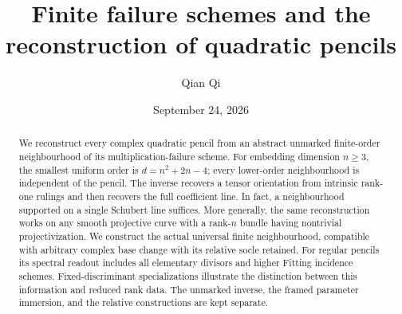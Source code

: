 \title[Finite failure schemes and quadratic pencils]{Finite failure schemes and the reconstruction of quadratic pencils}
\author{Qian Qi}
\date{September 24, 2026}
\begin{abstract}
We reconstruct every complex quadratic pencil from an abstract unmarked
finite-order neighbourhood of its multiplication-failure scheme.
For embedding dimension \(n\ge3\), the smallest uniform order is
\(d=n^2+2n-4\); every lower-order neighbourhood is independent of the
pencil.  The inverse recovers a tensor orientation from intrinsic
rank-one rulings and then recovers the full coefficient line.  In fact,
a neighbourhood supported on a single Schubert line suffices.  More
generally, the same reconstruction works on any smooth projective curve
with a rank-\(n\) bundle having nontrivial projectivization.  We construct
the actual universal finite neighbourhood, compatible with arbitrary
complex base change with its relative socle retained.  For regular
pencils its spectral readout includes all elementary divisors and
higher Fitting incidence schemes.  Fixed-discriminant specializations
illustrate the distinction between this information and reduced rank
data.  The unmarked inverse, the framed parameter immersion, and the
relative constructions are kept separate.
\end{abstract}
\maketitle
